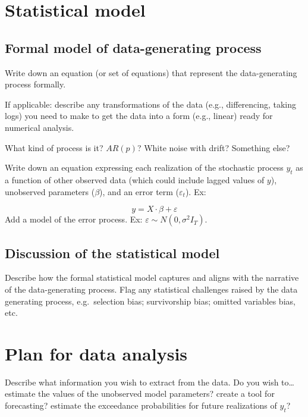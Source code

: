 \documentclass[
]{book}
\begin{document}
\hypertarget{statistical-model}{%
\section{Statistical model}\label{statistical-model}}

\hypertarget{formal-model-of-data-generating-process}{%
\subsection{Formal model of data-generating process}\label{formal-model-of-data-generating-process}}

Write down an equation (or set of equations) that represent the data-generating process formally.

If applicable: describe any transformations of the data (e.g., differencing, taking logs) you need to make to get the data into a form (e.g., linear) ready for numerical analysis.

What kind of process is it? \(AR(p)\)? White noise with drift? Something else?

Write down an equation expressing each realization of the stochastic process \(y_t\) as a function of other observed data (which could include lagged values of \(y\)), unobserved parameters (\(\beta\)), and an error term (\(\varepsilon_t\)). Ex:

\[y = X\cdot\beta + \varepsilon\] Add a model of the error process. Ex: \(\varepsilon \sim N(0, \sigma^2 I_T)\).

\hypertarget{discussion-of-the-statistical-model}{%
\subsection{Discussion of the statistical model}\label{discussion-of-the-statistical-model}}

Describe how the formal statistical model captures and aligns with the narrative of the data-generating process. Flag any statistical challenges raised by the data generating process, e.g.~selection bias; survivorship bias; omitted variables bias, etc.

\hypertarget{plan-for-data-analysis}{%
\section{Plan for data analysis}\label{plan-for-data-analysis}}

Describe what information you wish to extract from the data. Do you wish to\ldots{} estimate the values of the unobserved model parameters? create a tool for forecasting? estimate the exceedance probabilities for future realizations of \(y_t\)?
\end{document}
